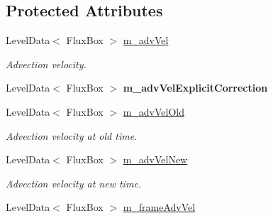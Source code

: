 \subsection*{Protected Attributes}
\begin{DoxyCompactItemize}
\item 
\hypertarget{class_a_m_r_level_mushy_layer_a1ee4e1a2fc0863bca7550be4e3dcc6c4}{Level\-Data$<$ Flux\-Box $>$ \hyperlink{class_a_m_r_level_mushy_layer_a1ee4e1a2fc0863bca7550be4e3dcc6c4}{m\-\_\-adv\-Vel}}\label{class_a_m_r_level_mushy_layer_a1ee4e1a2fc0863bca7550be4e3dcc6c4}

\begin{DoxyCompactList}\small\item\em Advection velocity. \end{DoxyCompactList}\item 
\hypertarget{class_a_m_r_level_mushy_layer_a43265d34b4981f1b0aa4008956e5ed6b}{Level\-Data$<$ Flux\-Box $>$ {\bfseries m\-\_\-adv\-Vel\-Explicit\-Correction}}\label{class_a_m_r_level_mushy_layer_a43265d34b4981f1b0aa4008956e5ed6b}

\item 
\hypertarget{class_a_m_r_level_mushy_layer_af8641fd347befbe1d1d1779102d08f74}{Level\-Data$<$ Flux\-Box $>$ \hyperlink{class_a_m_r_level_mushy_layer_af8641fd347befbe1d1d1779102d08f74}{m\-\_\-adv\-Vel\-Old}}\label{class_a_m_r_level_mushy_layer_af8641fd347befbe1d1d1779102d08f74}

\begin{DoxyCompactList}\small\item\em Advection velocity at old time. \end{DoxyCompactList}\item 
\hypertarget{class_a_m_r_level_mushy_layer_a348a74b9d75e95c79ea6a0edd050ab7f}{Level\-Data$<$ Flux\-Box $>$ \hyperlink{class_a_m_r_level_mushy_layer_a348a74b9d75e95c79ea6a0edd050ab7f}{m\-\_\-adv\-Vel\-New}}\label{class_a_m_r_level_mushy_layer_a348a74b9d75e95c79ea6a0edd050ab7f}

\begin{DoxyCompactList}\small\item\em Advection velocity at new time. \end{DoxyCompactList}\item 
\hypertarget{class_a_m_r_level_mushy_layer_a6faf8aa52dbd4627dce4a2408bac25e7}{Level\-Data$<$ Flux\-Box $>$ \hyperlink{class_a_m_r_level_mushy_layer_a6faf8aa52dbd4627dce4a2408bac25e7}{m\-\_\-frame\-Adv\-Vel}}\label{class_a_m_r_level_mushy_layer_a6faf8aa52dbd4627dce4a2408bac25e7}


\end{DoxyCompactItemize}
